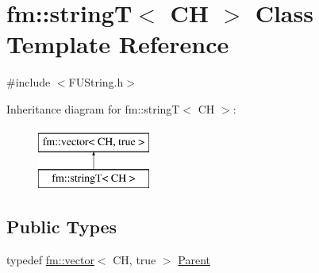 \hypertarget{classfm_1_1stringT}{
\section{fm::stringT$<$ CH $>$ Class Template Reference}
\label{classfm_1_1stringT}
}


{\ttfamily \#include $<$FUString.h$>$}

Inheritance diagram for fm::stringT$<$ CH $>$:\begin{figure}[H]
\begin{center}
\leavevmode
\includegraphics[height=2.000000cm]{classfm_1_1stringT}
\end{center}
\end{figure}
\subsection*{Public Types}
\begin{DoxyCompactItemize}
\item 
typedef \hyperlink{classfm_1_1vector}{fm::vector}$<$ CH, true $>$ \hyperlink{classfm_1_1stringT_a55d7525122109f4cc7cf052cf11dbe5e}{Parent}
\end{DoxyCompactItemize}
